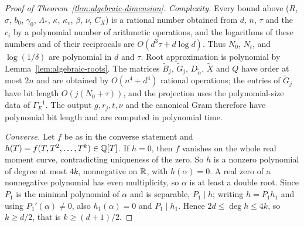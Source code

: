 \begin{proof}[Proof of Theorem~\ref{thm:algebraic-dimension}]
\emph{Complexity.} Every bound above ($R$, $\sigma$, $b_0$, $\gamma_0$,
$\Lambda_*$, $\kappa$, $\kappa_v$, $\beta$, $\nu$, $C_X$) is a rational number
obtained from $d$, $n$, $\tau$ and the $c_i$ by a polynomial number of
arithmetic operations, and the logarithms of these numbers and of their
reciprocals are $O(d^3\tau+d\log d)$. Thus
$N_0$, $N_t$, and $\log(1/\delta)$ are polynomial in $d$ and $\tau$. Root
approximation is polynomial by Lemma~\ref{lem:algebraic-roots}. The matrices
$\tilde B_j$, $\tilde G_j$, $D_{\tilde\alpha}$, $\tilde X$ and $Q$ have order at
most $2n$ and are obtained by $O(n^4+d^4)$ rational operations; the entries of
$\tilde G_j$ have bit length $O(j(N_0+\tau))$, and the projection uses the
polynomial-size data of $\Gamma_E^{-1}$. The output $g,r_j,t,\nu$ and the
canonical Gram therefore have polynomial bit length and are computed in
polynomial time.

\emph{Converse.} Let $f$ be as in the converse statement and
$h(T)=f(T,T^2,\ldots,T^k)\in\mathbb Q[T]$. If $h=0$, then $f$ vanishes on the whole
real moment curve, contradicting uniqueness of the zero. So $h$ is a nonzero
polynomial of degree at most $4k$, nonnegative on $\mathbb R$, with $h(\alpha)=0$.
A real zero of a nonnegative polynomial has even multiplicity, so $\alpha$ is
at least a double root. Since $P_1$ is the minimal polynomial of $\alpha$ and
is separable, $P_1\mid h$; writing $h=P_1h_1$ and using $P_1'(\alpha)\ne0$, also
$h_1(\alpha)=0$ and $P_1\mid h_1$. Hence $2d\le\deg h\le4k$, so
$k\ge d/2$, that is $k\ge(d+1)/2$.
\end{proof}

